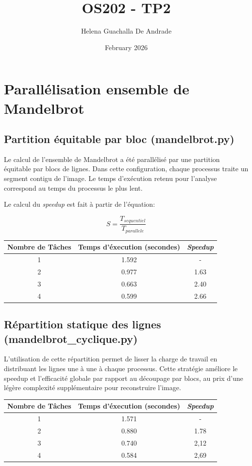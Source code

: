 \documentclass{article}
\title{OS202 - TP2}
\author{Helena Guachalla De Andrade}
\date{February 2026}
\begin{document}
\maketitle

\section{Parallélisation ensemble de Mandelbrot}

\subsection{Partition équitable par bloc (mandelbrot.py)}

Le calcul de l'ensemble de Mandelbrot a été parallélisé par une partition équitable par blocs de lignes. Dans cette configuration, chaque processus traite un segment contigu de l'image. Le temps d'exécution retenu pour l'analyse correspond au temps du processus le plus lent.

Le calcul du \textit{speedup} est fait à partir de l'équation:

\[ S = \frac{T_{sequentiel}}{T_{parallele}} \]

\begin{center}
\begin{tabular}{c c c}
Nombre de Tâches & Temps d'éxecution (secondes) & \textit{Speedup} \\
\hline
1 & 1.592 & - \\
2 & 0.977 & 1.63 \\
3 & 0.663 & 2.40 \\
4 & 0.599 & 2.66
\end{tabular}
\end{center}

\subsection{Répartition statique des lignes (mandelbrot\_cyclique.py)}

L'utilisation de cette répartition permet de lisser la charge de travail en distribuant les lignes une à une à chaque processus. Cette stratégie améliore le speedup et l'efficacité globale par rapport au découpage par blocs, au prix d'une légère complexité supplémentaire pour reconstruire l'image.

\begin{center}
\begin{tabular}{c c c}
Nombre de Tâches & Temps d'éxecution (secondes) & \textit{Speedup} \\
\hline
1 & 1.571 & - \\
2 & 0.880 & 1.78 \\
3 & 0.740 & 2,12 \\
4 & 0.584 & 2,69
\end{tabular}
\end{center}
\end{document}
